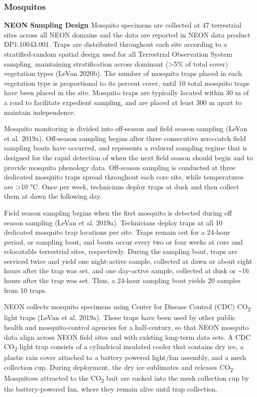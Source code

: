 \documentclass[
  12pt,
]{article}
\begin{document}
\hypertarget{mosquitos}{%
\subsubsection{Mosquitos}\label{mosquitos}}

\textbf{NEON Sampling Design} Mosquito specimens are collected at 47 terrestrial sites across all NEON domains and the data are reported in NEON data product DP1.10043.001. Traps are distributed throughout each site according to a stratified-random spatial design used for all Terrestrial Observation System sampling, maintaining stratification across dominant (\textgreater5\% of total cover) vegetation types (LeVan 2020b). The number of mosquito traps placed in each vegetation type is proportional to its percent cover, until 10 total mosquito traps have been placed in the site. Mosquito traps are typically located within 30 m of a road to facilitate expedient sampling, and are placed at least 300 m apart to maintain independence.

Mosquito monitoring is divided into off-season and field season sampling (LeVan et al. 2019a). Off-season sampling begins after three consecutive zero-catch field sampling bouts have occurred, and represents a reduced sampling regime that is designed for the rapid detection of when the next field season should begin and to provide mosquito phenology data. Off-season sampling is conducted at three dedicated mosquito traps spread throughout each core site, while temperatures are \textgreater10 °C. Once per week, technicians deploy traps at dusk and then collect them at dawn the following day.

Field season sampling begins when the first mosquito is detected during off season sampling (LeVan et al. 2019a). Technicians deploy traps at all 10 dedicated mosquito trap locations per site. Traps remain out for a 24-hour period, or sampling bout, and bouts occur every two or four weeks at core and relocatable terrestrial sites, respectively. During the sampling bout, traps are serviced twice and yield one night-active sample, collected at dawn or about eight hours after the trap was set, and one day-active sample, collected at dusk or \textasciitilde16 hours after the trap was set. Thus, a 24-hour sampling bout yields 20 samples from 10 traps.

NEON collects mosquito specimens using Center for Disease Control (CDC) CO\textsubscript{2} light traps (LeVan et al. 2019a). These traps have been used by other public health and mosquito-control agencies for a half-century, so that NEON mosquito data align across NEON field sites and with existing long-term data sets. A CDC CO\textsubscript{2} light trap consists of a cylindrical insulated cooler that contains dry ice, a plastic rain cover attached to a battery powered light/fan assembly, and a mesh collection cup. During deployment, the dry ice sublimates and releases CO\textsubscript{2}. Mosquitoes attracted to the CO\textsubscript{2} bait are sucked into the mesh collection cup by the battery-powered fan, where they remain alive until trap collection.
\end{document}
